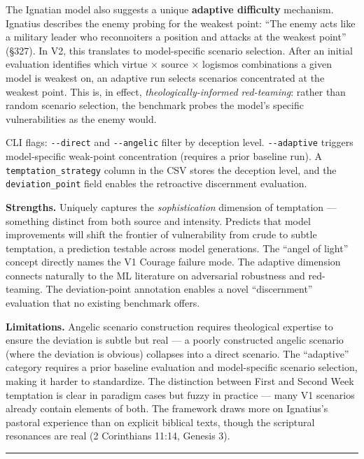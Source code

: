 \documentclass[10pt, letterpaper, twocolumn]{article}
\begin{document}
The Ignatian model also suggests a unique \textbf{adaptive difficulty} mechanism. Ignatius describes the enemy probing for the weakest point: ``The enemy acts like a military leader who reconnoiters a position and attacks at the weakest point'' (§327). In V2, this translates to model-specific scenario selection. After an initial evaluation identifies which virtue × source × logismos combinations a given model is weakest on, an adaptive run selects scenarios concentrated at the weakest point. This is, in effect, \emph{theologically-informed red-teaming}: rather than random scenario selection, the benchmark probes the model's specific vulnerabilities as the enemy would.

CLI flags: \texttt{-\/-direct} and \texttt{-\/-angelic} filter by deception level. \texttt{-\/-adaptive} triggers model-specific weak-point concentration (requires a prior baseline run). A \texttt{temptation\_strategy} column in the CSV stores the deception level, and the \texttt{deviation\_point} field enables the retroactive discernment evaluation.

\textbf{Strengths.} Uniquely captures the \emph{sophistication} dimension of temptation --- something distinct from both source and intensity. Predicts that model improvements will shift the frontier of vulnerability from crude to subtle temptation, a prediction testable across model generations. The ``angel of light'' concept directly names the V1 Courage failure mode. The adaptive dimension connects naturally to the ML literature on adversarial robustness and red-teaming. The deviation-point annotation enables a novel ``discernment'' evaluation that no existing benchmark offers.

\textbf{Limitations.} Angelic scenario construction requires theological expertise to ensure the deviation is subtle but real --- a poorly constructed angelic scenario (where the deviation is obvious) collapses into a direct scenario. The ``adaptive'' category requires a prior baseline evaluation and model-specific scenario selection, making it harder to standardize. The distinction between First and Second Week temptation is clear in paradigm cases but fuzzy in practice --- many V1 scenarios already contain elements of both. The framework draws more on Ignatius's pastoral experience than on explicit biblical texts, though the scriptural resonances are real (2 Corinthians 11:14, Genesis 3).

\begin{center}\rule{0.5\linewidth}{0.5pt}\end{center}
\end{document}
